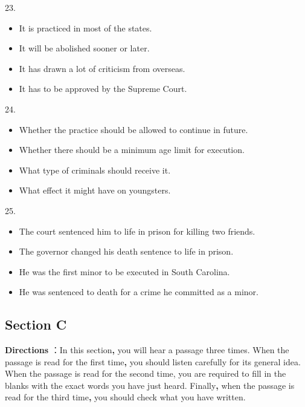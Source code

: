 \documentclass[UTF8,11pt]{ctexart}
\begin{document}
23.


\begin{itemize}[leftmargin=2em,itemsep=.2em,topsep=.4em]\item[A.] It is practiced in most of the states.
\item[B.] It will be abolished sooner or later.
\item[C.] It has drawn a lot of criticism from overseas.
\item[D.] It has to be approved by the Supreme Court.
\end{itemize}

24.


\begin{itemize}[leftmargin=2em,itemsep=.2em,topsep=.4em]\item[A.] Whether the practice should be allowed to continue in future.
\item[B.] Whether there should be a minimum age limit for execution.
\item[C.] What type of criminals should receive it.
\item[D.] What effect it might have on youngsters.
\end{itemize}

25.


\begin{itemize}[leftmargin=2em,itemsep=.2em,topsep=.4em]\item[A.] The court sentenced him to life in prison for killing two friends.
\item[B.] The governor changed his death sentence to life in prison.
\item[C.] He was the first minor to be executed in South Carolina.
\end{itemize}

\begin{itemize}[leftmargin=2em,itemsep=.2em,topsep=.4em]\item[D.] He was sentenced to death for a crime he committed as a minor.
\end{itemize}

\subsection*{\textbf{Section C}}


\textbf{Directions} ：In this section\textbf{,} you will hear a passage three times. When the passage is read for the first time\textbf{,} you should listen carefully for its general idea. When the passage is read for the second time, you are required to fill in the blanks with the exact words you have just heard. Finally\textbf{,} when the passage is read for the third time\textbf{,} you should check what you have written.
\end{document}
